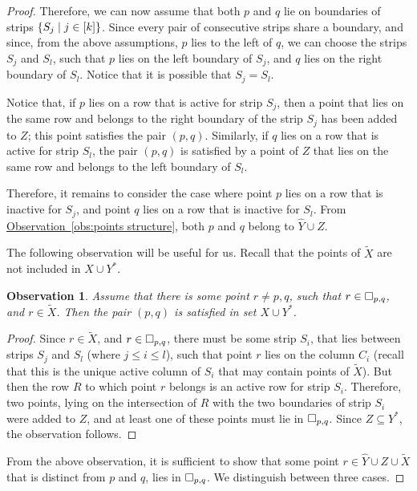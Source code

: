 \documentclass[11pt]{article}
\numberwithin{equation}{section}
\theoremstyle{definition}
\theoremstyle{plain}
\newcommand{\expref}[2]{\hyperref[#2]{#1~\ref{#2}}}
\newtheorem{myobs}[theorem]{Observation}
\begin{document}
\begin{proof}
Therefore, we can now assume that both $p$ and $q$ lie on boundaries of strips $\left\{ S_j \mid j \in [k] \right\}$. Since every pair of consecutive strips share a boundary, and since, from the above assumptions, $p$ lies to the left of $q$, we can choose the strips $S_j$ and $S_{l}$, such that $p$ lies on the left boundary of $S_j$, and $q$ lies on the right boundary of $S_{l}$. Notice that it is possible that $S_j=S_{l}$.

Notice that, if $p$ lies on a row that is active for strip $S_j$, then a point that lies on the same row and belongs to the right boundary of the strip $S_j$ has been added to $Z$; this point satisfies the pair $(p,q)$. Similarly, if $q$ lies on a row that is active for strip $S_{l}$, the pair $(p,q)$ is satisfied by a point of $Z$ that lies on the same row and belongs to the left boundary of $S_{l}$.

Therefore, it remains to consider the case where point $p$ lies on a row that is inactive for $S_j$, and point $q$ lies on a row that is inactive for $S_{l}$. From \expref{Observation}{obs:points structure}, both $p$ and $q$ belong to $\hat Y\cup Z$.

The following observation will be useful for us. Recall that the points of $\widetilde{X}$ are not included in $X\cup Y^*$.

\begin{myobs}\label{obs: satisfied by Xc}
	Assume that there is some point $r\neq p,q$, such that $r\in \Box_{p,q}$, and $r\in \widetilde{X}$. Then the pair $(p,q)$ is satisfied in set $X\cup Y^*$.
	\end{myobs}
\begin{proof}
	Since $r\in \widetilde{X}$, and $r\in \Box_{p,q}$, there must be some strip $S_i$, that lies between strips $S_j$ and $S_{l}$ (where $j \leq i \leq l$), such that point $r$ lies on the column $C_i$ (recall that this is the unique active column of $S_i$ that may contain points of $\widetilde{X}$). But then the row $R$ to which point $r$ belongs is an active row for strip $S_i$. Therefore, two  points, lying on the intersection of $R$ with the two boundaries of strip $S_i$ were added to $Z$, and at least one of these points must lie in $\Box_{p,q}$. Since $Z\subseteq Y^*$, the observation follows.
\end{proof}



From the above observation, it is sufficient to show that some point $r\in \hat Y\cup Z\cup \widetilde{X}$ that is distinct from $p$ and $q$, lies in $\Box_{p,q}$.
We distinguish between three cases.


\end{proof}
\end{document}
